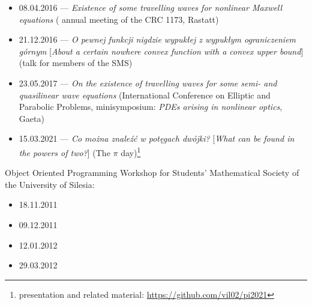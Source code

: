 \begin{itemize}
  \item 08.04.2016 --- \textsl{Existence of some travelling waves for nonlinear Maxwell equations} ( annual meeting of the CRC 1173, Rastatt)
  \item 21.12.2016 --- \textsl{O pewnej funkcji nigdzie wypukłej z wypukłym ograniczeniem górnym} [\textsl{About a certain nowhere convex function with a convex upper bound}] (talk for members of the SMS)
  \item 23.05.2017 --- \textsl{On the existence of travelling waves for some semi- and quasilinear wave equations} (International Conference on Elliptic and Parabolic Problems, minisymposium: \textit{PDEs arising in nonlinear optics}, Gaeta)
  \item 15.03.2021 --- \textsl{Co można znaleźć w potęgach dwójki?} [\textsl{What can be found in the powers of two?}] (The $\pi$ day)\footnote{presentation and related material: \url{https://github.com/vil02/pi2021}}
\end{itemize}
\noindent Object Oriented Programming Workshop for Students' Mathematical Society of the University of Silesia:
\begin{itemize}
  \item 18.11.2011
  \item 09.12.2011
  \item 12.01.2012
  \item 29.03.2012
\end{itemize}
